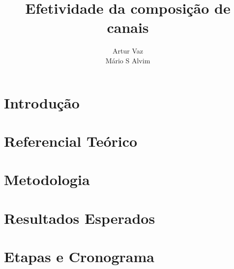 \documentclass[runningheads,a4paper]{llncs2e/llncs}
\begin{document}
\mainmatter  %

\title{Efetividade da composição de canais}


%
%
\author{Artur Vaz\\
Mário S Alvim}
%


%
%

\maketitle

\section{Introdução}
\label{sec:introducao}


\section{Referencial Teórico}
\label{sec:referencial_teorico}


\section{Metodologia}
\label{sec:metodologia}


\section{Resultados Esperados}
\label{sec:resultados}


\section{Etapas e Cronograma}
\label{sec:etapas}


%
%

\appendix
%

%
\end{document}
